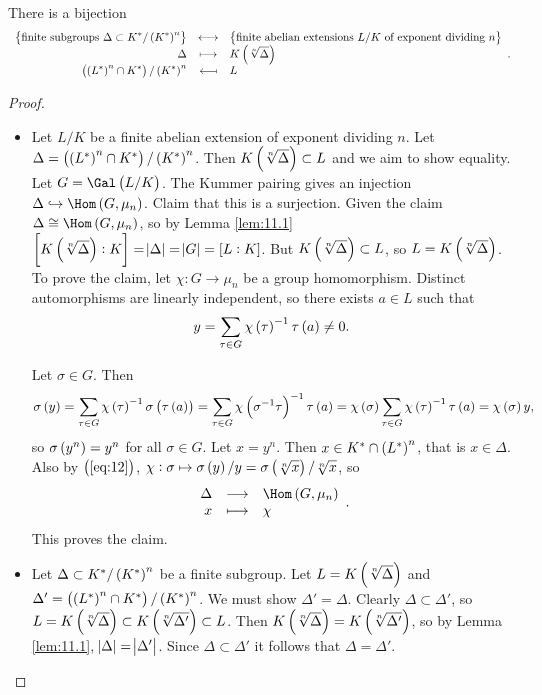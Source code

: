 \begin{theorem}
\label{thm:11.2}
There is a bijection
$$ \bijection{\cbr{\text{finite subgroups} \ \Delta \subset K^* / \br{K^*}^n}}{\cbr{\text{finite abelian extensions} \ L / K \ \text{of exponent dividing} \ n}}{\Delta}{K\br{\sqrt[n]{\Delta}}}{\br{\br{L^*}^n \cap K^*} / \br{K^*}^n}{L}. $$
\end{theorem}

\begin{proof}
\hfill
\begin{itemize}
\item Let $ L / K $ be a finite abelian extension of exponent dividing $ n $. Let $ \Delta = \br{\br{L^*}^n \cap K^*} / \br{K^*}^n $. Then $ K\br{\sqrt[n]{\Delta}} \subset L $ and we aim to show equality. Let $ G = \Gal\br{L / K} $. The Kummer pairing gives an injection $ \Delta \hookrightarrow \Hom\br{G, \mu_n} $. Claim that this is a surjection. Given the claim $ \Delta \cong \Hom\br{G, \mu_n} $, so by Lemma \ref{lem:11.1} $ \sbr{K\br{\sqrt[n]{\Delta}} : K} = \abs{\Delta} = \abs{G} = \sbr{L : K} $. But $ K\br{\sqrt[n]{\Delta}} \subset L $, so $ L = K\br{\sqrt[n]{\Delta}} $. To prove the claim, let $ \chi : G \to \mu_n $ be a group homomorphism. Distinct automorphisms are linearly independent, so there exists $ a \in L $ such that
$$ y = \sum_{\tau \in G} \chi\br{\tau}^{-1}\tau\br{a} \ne 0. $$

\pagebreak

Let $ \sigma \in G $. Then
\begin{equation}
\label{eq:12}
\sigma\br{y} = \sum_{\tau \in G} \chi\br{\tau}^{-1}\sigma\br{\tau\br{a}} = \sum_{\tau \in G} \chi\br{\sigma^{-1}\tau}^{-1}\tau\br{a} = \chi\br{\sigma}\sum_{\tau \in G} \chi\br{\tau}^{-1}\tau\br{a} = \chi\br{\sigma}y,
\end{equation}
so $ \sigma\br{y^n} = y^n $ for all $ \sigma \in G $. Let $ x = y^n $. Then $ x \in K^* \cap \br{L^*}^n $, that is $ x \in \Delta $. Also by $ \br{\ref{eq:12}} $, $ \chi : \sigma \mapsto \sigma\br{y} / y = \sigma\br{\sqrt[n]{x}} / \sqrt[n]{x} $, so
$$ \function{\Delta}{\Hom\br{G, \mu_n}}{x}{\chi}. $$
This proves the claim.
\item Let $ \Delta \subset K^* / \br{K^*}^n $ be a finite subgroup. Let $ L = K\br{\sqrt[n]{\Delta}} $ and $ \Delta' = \br{\br{L^*}^n \cap K^*} / \br{K^*}^n $. We must show $ \Delta' = \Delta $. Clearly $ \Delta \subset \Delta' $, so $ L = K\br{\sqrt[n]{\Delta}} \subset K\br{\sqrt[n]{\Delta'}} \subset L $. Then $ K\br{\sqrt[n]{\Delta}} = K\br{\sqrt[n]{\Delta'}} $, so by Lemma \ref{lem:11.1}, $ \abs{\Delta} = \abs{\Delta'} $. Since $ \Delta \subset \Delta' $ it follows that $ \Delta = \Delta' $.
\end{itemize}
\end{proof}

